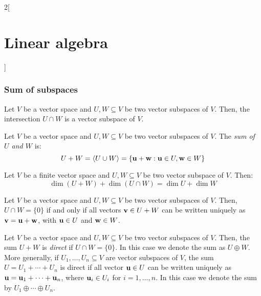 \documentclass[../../../main.tex]{subfiles}
\begin{document}
\begin{multicols}{2}[\section{Linear algebra}]
    \subsubsection*{Sum of subspaces}
    \begin{lemma}
        Let $V$ be a vector space and $U,W\subseteq V$ be two vector subspaces of $V$. Then, the intersection $U\cap W$ is a vector subspace of $V$.
    \end{lemma}
    \begin{definition}
        Let $V$ be a vector space and $U,W\subseteq V$ be two vector subspaces of $V$. The \textit{sum of $U$ and $W$} is: $$U+W=\langle U\cup W\rangle=\{\boldsymbol{\mathrm{u}}+\boldsymbol{\mathrm{w}}: \boldsymbol{\mathrm{u}}\in U,\boldsymbol{\mathrm{w}}\in W\}$$
    \end{definition}
    \begin{prop}
        Let $V$ be a finite vector space and $U,W\subseteq V$ be two vector subspace of $V$. Then: $$\dim (U+W)+\dim(U\cap W)=\dim U+\dim W$$
    \end{prop}
    \begin{lemma}
        Let $V$ be a vector space and $U,W\subseteq V$ be two vector subspaces of $V$. Then, $U\cap W=\{0\}$ if and only if all vectors $\boldsymbol{\mathrm{v}}\in U+W$ can be written uniquely as $\boldsymbol{\mathrm{v}}=\boldsymbol{\mathrm{u}}+\boldsymbol{\mathrm{w}}$, with $\boldsymbol{\mathrm{u}}\in U$ and $\boldsymbol{\mathrm{w}}\in W$.
    \end{lemma}
    \begin{definition}
        Let $V$ be a vector space and $U,W\subseteq V$ be two vector subspaces of $V$. Then, the sum $U+W$ is \textit{direct} if $U\cap W=\{0\}$. In this case we denote the sum as $U\oplus W$. More generally, if $U_1,\ldots,U_n\subseteq V$ are vector subspaces of $V$, the sum $U=U_1+\cdots+U_n$ is direct if all vector $\boldsymbol{\mathrm{u}}\in U$ can be written uniquely as $\boldsymbol{\mathrm{u}}=\boldsymbol{\mathrm{u}}_1+\cdots+\boldsymbol{\mathrm{u}}_n$, where $\boldsymbol{\mathrm{u}}_i\in U_i$ for $i=1,\ldots,n$. In this case we denote the sum by $U_1\oplus\cdots\oplus U_n$.
    \end{definition}

\end{multicols}
\end{document}
